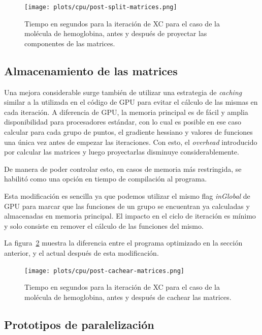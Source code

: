 \begin{figure}[htbp]
   \centering
   \texttt{[image: plots/cpu/post-split-matrices.png]}
   \caption{Tiempo en segundos para la iteraci\'on de XC para el caso de la
   mol\'ecula de hemoglobina, antes y despu\'es de proyectar las componentes
   de las matrices.}
   \label{fig:lio-post-partir-mats}
\end{figure}

\subsection{Almacenamiento de las matrices}

Una mejora considerable surge tambi\'en de utilizar una estrategia de \textit{caching}
similar a la utilizada en el c\'odigo de GPU para evitar el c\'alculo de las mismas
en cada iteraci\'on. A diferencia de GPU, la memoria principal es de f\'acil y
amplia disponibilidad para procesadores est\'andar, con lo cual es posible en ese
caso calcular para cada grupo de puntos, el gradiente hessiano y valores de
funciones una \'unica vez antes de empezar las iteraciones. Con esto, el
\textit{overhead} introducido por calcular las matrices y luego proyectarlas
disminuye considerablemente.

De manera de poder controlar esto, en casos de memoria m\'as restringida, se
habilit\'o como una opci\'on en tiempo de compilaci\'on al programa.

Esta modificaci\'on es sencilla ya que podemos utilizar el mismo flag
\textit{inGlobal} de GPU para marcar que las funciones de un grupo se encuentran
ya calculadas y almacenadas en memoria principal. El impacto en el ciclo de
iteraci\'on es m\'inimo y solo consiste en remover el c\'alculo de las funciones
del mismo.

La figura~\ref{fig:lio-post-cachear} muestra la diferencia entre el programa
optimizado en la secci\'on anterior, y el actual despu\'es de esta modificaci\'on.

\begin{figure}[htbp]
   \centering
   \texttt{[image: plots/cpu/post-cachear-matrices.png]}
   \caption{Tiempo en segundos para la iteraci\'on de XC para el caso de la
   mol\'ecula de hemoglobina, antes y despu\'es de cachear las matrices.}
   \label{fig:lio-post-cachear}
\end{figure}

\subsection{Prototipos de paralelizaci\'on}

